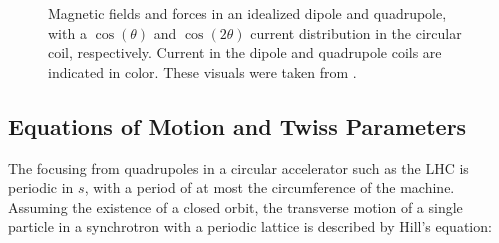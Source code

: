 \begin{figure}[htp]
    \centering
    \hspace{0.5cm}
    \caption{Magnetic fields and forces in an idealized dipole and quadrupole, with a \(\cos(\theta)\) and \(\cos(2\theta)\) current distribution in the circular coil, respectively. Current in the dipole and quadrupole coils are indicated in color. These visuals were taken from \cite{CERN:Russenschuck:CAS_Design_Magnets}.}
    \label{figure:dipole_quadrupole_fields}
\end{figure}

\subsection{Equations of Motion and Twiss Parameters}

The focusing from quadrupoles in a circular accelerator such as the LHC is periodic in \(s\), with a period of at most the circumference of the machine.
Assuming the existence of a closed orbit, the transverse motion of a single particle in a synchrotron with a periodic lattice is described by Hill's equation:

